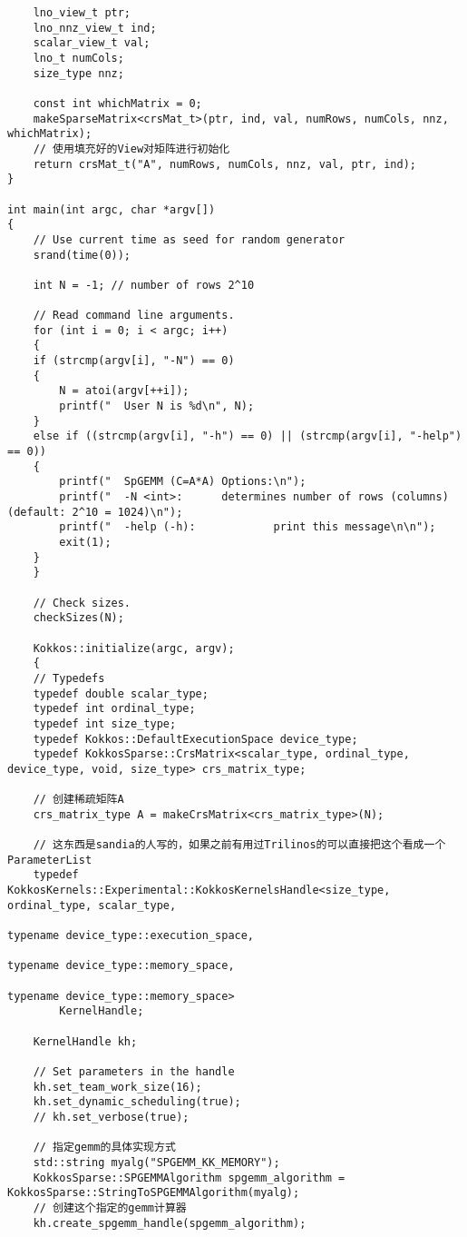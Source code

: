 \begin{lstlisting}
    lno_view_t ptr;
    lno_nnz_view_t ind;
    scalar_view_t val;
    lno_t numCols;
    size_type nnz;

    const int whichMatrix = 0;
    makeSparseMatrix<crsMat_t>(ptr, ind, val, numRows, numCols, nnz, whichMatrix);
    // 使用填充好的View对矩阵进行初始化
    return crsMat_t("A", numRows, numCols, nnz, val, ptr, ind);
}

int main(int argc, char *argv[])
{
    // Use current time as seed for random generator
    srand(time(0)); 

    int N = -1; // number of rows 2^10

    // Read command line arguments.
    for (int i = 0; i < argc; i++)
    {
    if (strcmp(argv[i], "-N") == 0)
    {
        N = atoi(argv[++i]);
        printf("  User N is %d\n", N);
    }
    else if ((strcmp(argv[i], "-h") == 0) || (strcmp(argv[i], "-help") == 0))
    {
        printf("  SpGEMM (C=A*A) Options:\n");
        printf("  -N <int>:      determines number of rows (columns) (default: 2^10 = 1024)\n");
        printf("  -help (-h):            print this message\n\n");
        exit(1);
    }
    }

    // Check sizes.
    checkSizes(N);

    Kokkos::initialize(argc, argv);
    {
    // Typedefs
    typedef double scalar_type;
    typedef int ordinal_type;
    typedef int size_type;
    typedef Kokkos::DefaultExecutionSpace device_type;
    typedef KokkosSparse::CrsMatrix<scalar_type, ordinal_type, device_type, void, size_type> crs_matrix_type;

    // 创建稀疏矩阵A
    crs_matrix_type A = makeCrsMatrix<crs_matrix_type>(N);

    // 这东西是sandia的人写的，如果之前有用过Trilinos的可以直接把这个看成一个ParameterList
    typedef KokkosKernels::Experimental::KokkosKernelsHandle<size_type, ordinal_type, scalar_type,
                                                                typename device_type::execution_space, 
                                                                typename device_type::memory_space, 
                                                                typename device_type::memory_space>
        KernelHandle;

    KernelHandle kh;

    // Set parameters in the handle
    kh.set_team_work_size(16);
    kh.set_dynamic_scheduling(true);
    // kh.set_verbose(true);

    // 指定gemm的具体实现方式
    std::string myalg("SPGEMM_KK_MEMORY");
    KokkosSparse::SPGEMMAlgorithm spgemm_algorithm = KokkosSparse::StringToSPGEMMAlgorithm(myalg);
    // 创建这个指定的gemm计算器
    kh.create_spgemm_handle(spgemm_algorithm);


\end{lstlisting}
